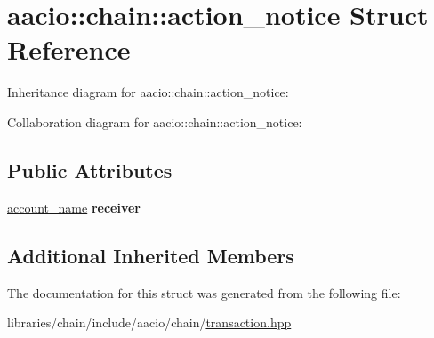 \hypertarget{structaacio_1_1chain_1_1action__notice}{}\section{aacio\+:\+:chain\+:\+:action\+\_\+notice Struct Reference}
\label{structaacio_1_1chain_1_1action__notice}


Inheritance diagram for aacio\+:\+:chain\+:\+:action\+\_\+notice\+:


Collaboration diagram for aacio\+:\+:chain\+:\+:action\+\_\+notice\+:
\subsection*{Public Attributes}
\begin{DoxyCompactItemize}
\item 
\mbox{\label{structaacio_1_1chain_1_1action__notice_a562b8bf99119a75c28d37a0af2b46d2e}} 
\mbox{\hyperlink{structaacio_1_1chain_1_1name}{account\+\_\+name}} {\bfseries receiver}
\end{DoxyCompactItemize}
\subsection*{Additional Inherited Members}


The documentation for this struct was generated from the following file\+:\begin{DoxyCompactItemize}
\item 
libraries/chain/include/aacio/chain/\mbox{\hyperlink{libraries_2chain_2include_2aacio_2chain_2transaction_8hpp}{transaction.\+hpp}}\end{DoxyCompactItemize}
